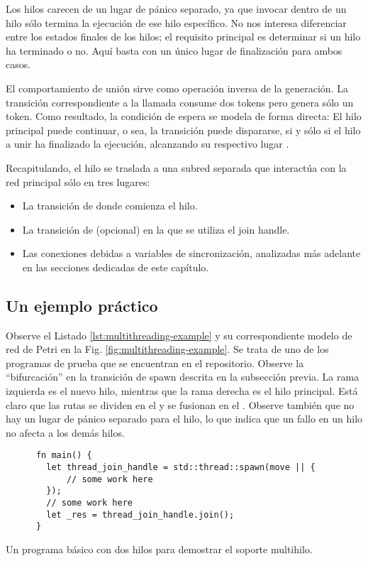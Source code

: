 Los hilos carecen de un lugar de pánico separado, ya que invocar  dentro de un hilo sólo
termina la ejecución de ese hilo específico. No nos interesa diferenciar entre los estados finales
de los hilos; el requisito principal es determinar si un hilo ha terminado o no. Aquí basta con un
único lugar de finalización para ambos casos.

El comportamiento de unión sirve como operación inversa de la generación. La transición
correspondiente a la llamada  consume dos tokens pero genera sólo un token.
Como resultado, la condición de espera se modela de forma directa:
El hilo principal puede continuar, o sea, la
transición  puede dispararse, si y sólo si el hilo a unir ha finalizado la ejecución, alcanzando
su respectivo lugar .


Recapitulando, el hilo se traslada a una subred separada que interactúa con la red principal
sólo en tres lugares:

\begin{itemize}
      \item La transición de  donde comienza el hilo.
      \item La transición de  (opcional) en la que se utiliza el join handle.
      \item Las conexiones debidas a variables de sincronización, analizadas más adelante en las
            secciones dedicadas de este capítulo.
\end{itemize}

\subsection{Un ejemplo práctico}

Observe el Listado \ref{lst:multithreading-example}
y su correspondiente modelo de red de Petri en la Fig. \ref{fig:multithreading-example}.
Se trata de uno de los programas de prueba que se encuentran en el repositorio.
Observe la ``bifurcación'' en la
transición de spawn descrita en la subsección previa.
La rama izquierda es el nuevo hilo,
mientras que la rama derecha es el hilo principal.
Está claro que las rutas se dividen en el 
y se fusionan en el . Observe también que no hay un lugar de pánico separado para el hilo,
lo que indica que un fallo en un hilo no afecta a los demás hilos.

\begin{listing}[!htb]
      \begin{verbatim}
      fn main() {
        let thread_join_handle = std::thread::spawn(move || {
            // some work here
        });
        // some work here
        let _res = thread_join_handle.join();
      }  
      \end{verbatim}
      \caption{Un programa básico con dos hilos para demostrar el soporte multihilo.}
      \label{lst:multithreading-example}
\end{listing}

